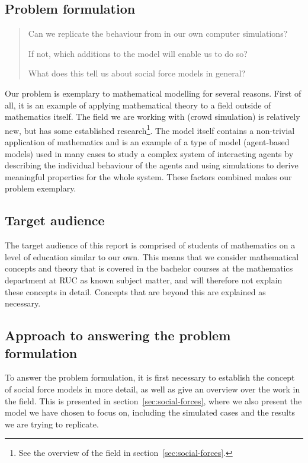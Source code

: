 \subsection{Problem formulation}
\begin{quote}
    Can we replicate the behaviour from \cite{self-org} in our own computer 
    simulations?

    If not, which additions to the model will enable us to do so?

    What does this tell us about social force models in general?
\end{quote}

Our problem is exemplary to mathematical modelling for several reasons. First 
of all, it is an example of applying mathematical theory to a field outside of 
mathematics itself. The field we are working with (crowd simulation) is 
relatively new, but has some established research\footnote{See the overview of 
the field in section~\ref{sec:social-forces}.}. The model itself contains a 
non-trivial application of mathematics and is an example of a type of model 
(agent-based models) used in many cases to study a complex system of 
interacting agents by describing the individual behaviour of the agents and 
using simulations to derive meaningful properties for the whole system. These 
factors combined makes our problem exemplary.

\subsection{Target audience}
The target audience of this report is comprised of students of mathematics on 
a level of education similar to our own. This means that we consider 
mathematical concepts and theory that is covered in the bachelor courses at 
the mathematics department at RUC as known subject matter, and will therefore 
not explain these concepts in detail. Concepts that are beyond this are 
explained as necessary.

\subsection{Approach to answering the problem formulation}
To answer the problem formulation, it is first necessary to establish the 
concept of social force models in more detail, as well as give an overview 
over the work in the field. This is presented in 
section~\ref{sec:social-forces}, where we also present the model we have chosen 
to focus on, including the simulated cases and the results we are trying to replicate.

